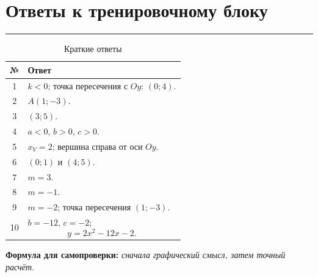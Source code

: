\documentclass[a4paper,12pt]{article}
\newcommand{\sectionline}{%
  \par\noindent
  \color{accent}\rule{\linewidth}{0.5pt}
  \color{black}\par
}
\begin{document}

\clearpage

\section*{Ответы к тренировочному блоку}
\sectionline

\begin{table}[h!]
\centering
\caption{Краткие ответы}

\begin{tabularx}{\linewidth}{@{}cX@{}}
\toprule
\textbf{№} & \textbf{Ответ} \\
\midrule

1
&
$k<0$;
точка пересечения с $Oy$: $(0;4)$.
\\

2
&
$A(1;-3)$.
\\

3
&
$(3;5)$.
\\

4
&
$a<0$,
$b>0$,
$c>0$.
\\

5
&
$x_V=2$;
вершина справа от оси $Oy$.
\\

6
&
$(0;1)$ и $(4;5)$.
\\

7
&
$m=3$.
\\

8
&
$m=-1$.
\\

9
&
$m=-2$;
точка пересечения $(1;-3)$.
\\

10
&
$b=-12$,
$c=-2$;
\[
y=2x^2-12x-2.
\]
\\

\bottomrule
\end{tabularx}
\end{table}

\vfill

\begin{center}
\textcolor{darkaccent}{\textbf{Формула для самопроверки:}}
\quad
\textit{сначала графический смысл, затем точный расчёт.}
\end{center}
\end{document}
